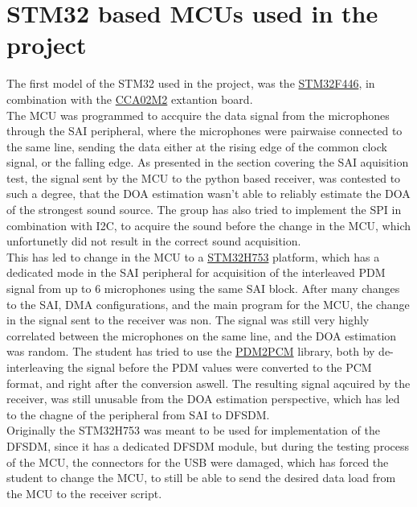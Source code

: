 
\section{STM32 based MCUs used in the project}
\label{sec:stm32_models_reasoning}
The first model of the STM32 used in the project, was the \href{https://www.st.com/en/microcontrollers-microprocessors/stm32f446.html}{STM32F446}, in combination with the \href{https://www.st.com/en/evaluation-tools/x-nucleo-cca02m2.html}{CCA02M2} extantion board.\\ The MCU was programmed to accquire the data signal from the microphones through the SAI peripheral, where the microphones were pairwaise connected to the same line, sending the data either at the rising edge of the common clock signal, or the falling edge. As presented in the section covering the SAI aquisition test, the signal sent by the MCU to the python based receiver, was contested to such a degree, that the DOA estimation wasn't able to reliably estimate the DOA of the strongest sound source. The group has also tried to implement the SPI in combination with I2C, to acquire the sound before the change in the MCU, which unfortunetly did not result in the correct sound acquisition. \\ %

This has led to change in the MCU to a \href{https://www.st.com/en/microcontrollers-microprocessors/stm32h743-753.html}{STM32H753} platform, which has a dedicated mode in the SAI peripheral for acquisition of the interleaved PDM signal from up to 6 microphones using the same SAI block. After many changes to the SAI, DMA configurations, and the main program for the MCU, the change in the signal sent to the receiver was non. The signal was still very highly correlated between the microphones on the same line, and the DOA estimation was random. The student has tried to use the \href{https://www.st.com/resource/en/user_manual/um2372-stm32cube-pdm2pcm-software-library-for-the-stm32f4f7h7-series-stmicroelectronics.pdf}{PDM2PCM} library, both by de-interleaving the signal before the PDM values were converted to the PCM format, and right after the conversion aswell. The resulting signal aqcuired by the receiver, was still unusable from the DOA estimation perspective, which has led to the chagne of the peripheral from SAI to DFSDM.\\

Originally the STM32H753 was meant to be used for implementation of the DFSDM, since it has a dedicated DFSDM module, but during the testing process of the MCU, the connectors for the USB were damaged, which has forced the student to change the MCU, to still be able to send the desired data load from the MCU to the receiver script.\\

